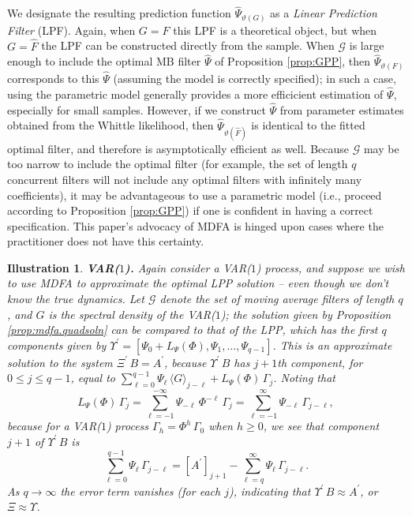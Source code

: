\documentclass[a4paper]{book}
\def\tends{\rightarrow}
\newtheorem{Illustration}{Illustration}
\begin{document}
 
  We designate the resulting   prediction function
$\widehat{\Psi}_{ {\vartheta} (G)}$  as  a {\em Linear
Prediction Filter} (LPF).   Again, when $G=F$ this LPF is a theoretical
 object, but when $G = \widehat{F}$ the LPF can be constructed directly from the sample.
  When $\mathcal{G}$ is large enough to include the optimal MB filter
 $\widehat{\Psi}  $ of Proposition  \ref{prop:GPP},  then
 $\widehat{\Psi}_{ {\vartheta} (F)} $ corresponds to  this $\widehat{\Psi}$ (assuming  the model 
 is correctly specified);  in such a case, using the parametric model generally
 provides a more efficicient estimation of $\widehat{\Psi}$, especially
 for small samples.    However, if we construct $\widehat{\Psi}$ from
 parameter estimates obtained from the Whittle likelihood, then
 $\widehat{\Psi}_{ {\vartheta} ( \widehat{F})}$ is identical to the fitted optimal filter,
  and therefore is asymptotically efficient as well.
  Because $\mathcal{G}$ may be too narrow to include the optimal filter
 (for example, the set of length $q$ concurrent filters will not include 
 any optimal filters with infinitely many coefficients),  it may be
 advantageous to use a parametric model (i.e., proceed according
 to Proposition  \ref{prop:GPP}) if one is confident in having a 
 correct specification.   This paper's advocacy of MDFA is hinged
 upon cases where the practitioner does not have this certainty.


\begin{Illustration} {\bf VAR($1$).}  \rm
\label{ill:var1.3}
 Again consider a VAR($1$) process,
 and suppose we wish to use MDFA to approximate the optimal LPP
 solution -- even though we don't know the true dynamics.
   Let $\mathcal{G}$ denote the set of moving average filters of
 length $q$, and $G$ is the spectral density of the VAR($1$);
  the solution given by Proposition \ref{prop:mdfa.quadsoln}
 can be compared to that of the LPP, which has the first $q$ components
 given by $  \Upsilon^{\prime} = [ \Psi_{0} + L_{\Psi} (\Phi), \Psi_{1},
 \ldots, \Psi_{q-1}  ]$.
 This is an approximate solution to the system $\Xi^{\prime} \, B
 =  A^{\prime}$, because
 $  \Upsilon^{\prime} \, B $ has $j+1$th component, for $0 \leq j \leq q-1$,
 equal to  $   \sum_{\ell=0}^{q-1} \Psi_{\ell} \, {\langle G \rangle }_{j-\ell}
 + L_{\Psi} (\Phi) \, \Gamma_j$.
  Noting that
\[
 L_{\Psi} (\Phi) \, \Gamma_j
 = \sum_{\ell = -1 }^{-\infty} \Psi_{-\ell} \, \Phi^{-\ell} \, \Gamma_j
 = \sum_{\ell = -1}^{\infty} \Psi_{-\ell} \, \Gamma_{j- \ell},
\]
 because for a VAR($1$) process $\Gamma_h = \Phi^h \, \Gamma_0$ when
 $h \geq 0$, we see that component $j+1$ of $\Upsilon^{\prime} \, B$ is
\[
  \sum_{\ell =0 }^{ q-1} \Psi_{\ell} \, \Gamma_{j-\ell}
  =  {[   A^{\prime} ]}_{j+1} - \sum_{\ell = q}^{\infty} \Psi_{\ell} \, \Gamma_{j-\ell}.
\]
 As $q \tends \infty$ the error term vanishes (for each $j$), indicating
 that $\Upsilon^{\prime} \, B \approx  A^{\prime}$, or
 $\Xi \approx \Upsilon$.
\end{Illustration}
 
\end{document}
